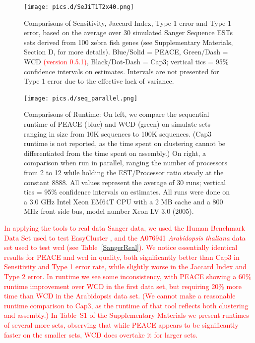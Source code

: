 \documentclass[a4,center,fleqn]{NAR}
\newcommand{\mc}[1]{\textcolor{red}{#1}}
\newcommand{\peace} {{\small PEACE}}
\newcommand{\wcd} {{\small WCD}}
\newcommand{\capthree} {{\small Cap3}}
\newcommand{\easycluster} {{\small EasyCluster}}
\begin{document}
\begin{figure}
  \centerline{\texttt{[image: pics.d/SeJiT1T2x40.png]}}
  \caption{Comparisons of Sensitivity, Jaccard Index, Type 1 error and
    Type 1 error, based on the average over 30 simulated Sanger
    Sequence ESTs sets derived from 100 zebra fish genes (see
    Supplementary Materials, Section D, for more details).  Blue/Solid
    = \peace, Green/Dash = \wcd\/ \mc{(version 0.5.1)}, Black/Dot-Dash =
    \capthree; vertical tics = 95\% confidence intervals on estimates.
    Intervals are not presented for Type 1 error due to the effective
    lack of variance.}\label{SeJiT1T2}
\end{figure}

\begin{figure}
   \centerline{\texttt{[image: pics.d/seq\_parallel.png]}}
   \caption{Comparisons of Runtime: On left, we compare the sequential
     runtime of \peace\/ (blue) and \wcd\/ (green) on simulate sets
     ranging in size from 10K sequences to 100K sequences.  (\capthree\/
     runtime is not reported, as the time spent on clustering cannot
     be differentiated from the time spent on assembly.)  On right,
     a comparison when run in parallel, ranging the number of
     processors from 2 to 12 while holding the EST/Processor ratio
     steady at the constant 8888.  All values represent the average
     of 30 runs; vertical tics = 95\% confidence intervals on
     estimates.  All runs were done on a 3.0 GHz Intel Xeon EM64T CPU with a 2 MB
     cache and a 800 MHz front side bus, model number Xeon LV 3.0 (2005).}\label{seq_parallel}
\end{figure}

\mc{In applying the tools to real data Sanger data, we used the Human
  Benchmark Data Set used to test \easycluster\/ \cite{Picardi09}, and
  the A076941 {\it Arabidopsis thaliana} data set used to test wcd\/
  \cite{Hazelhurst08a,Hazelhurst08b} (see Table~\ref{SangerReal}).
  We notice essentially identical results for \peace\/ and wcd\/ in
  quality, both significantly better than \capthree\/ in Sensitivity and Type
  1 error rate, while slightly worse in the Jaccard Index and Type 2
  error.  In runtime we see some inconsistency, with \peace\/ showing a
  60\% runtime improvement over \wcd\/ in the first data set, but requiring 20\%
  more time than \wcd\/ in the Arabidopsis data set.  (We cannot make
  a reasonable runtime comparison to \capthree, as the runtime of that
  tool reflects both clustering and assembly.)  In Table~S1 of the
  Supplementary Materials we present runtimes of several more sets,
  observing that while \peace\/ appears to be significantly 
  faster on the smaller sets, \wcd\/ does overtake it for larger
  sets.}
\end{document}

